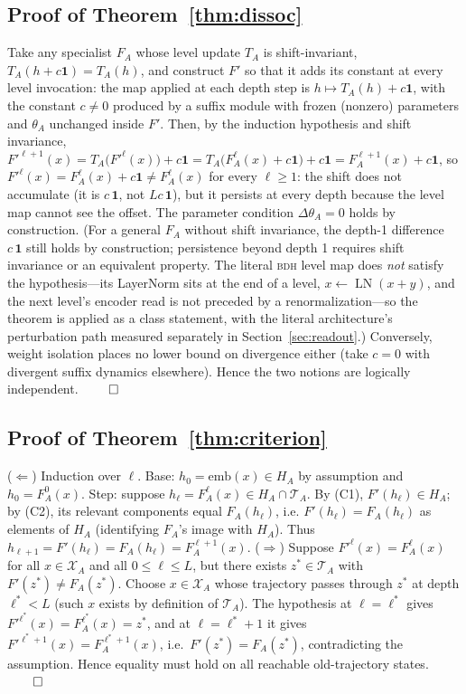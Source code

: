 \documentclass[11pt]{article}
\theoremstyle{definition}\newtheorem{definition}{Definition}
\theoremstyle{remark}\newtheorem{remark}{Remark}
\newcommand{\BDH}{\textsc{bdh}}
\newcommand{\Xa}{\mathcal{X}_A}
\newcommand{\TA}{\mathcal{T}_A}
\begin{document}
\subsection{Proof of Theorem~\ref{thm:dissoc}}
Take any specialist $F_A$ whose level update $T_A$ is shift-invariant,
$T_A(h+c\mathbf{1})=T_A(h)$, and construct $F'$ so that it adds its constant at every level
invocation: the map applied at each depth step is $h\mapsto T_A(h)+c\mathbf{1}$, with the
constant $c\neq0$ produced by a suffix module with frozen (nonzero) parameters and $\theta_A$
unchanged inside $F'$. Then, by the induction hypothesis and shift invariance,
$F'^{\ell+1}(x)=T_A\bigl(F'^{\ell}(x)\bigr)+c\mathbf{1}
=T_A\bigl(F_A^{\ell}(x)+c\mathbf{1}\bigr)+c\mathbf{1}=F_A^{\ell+1}(x)+c\mathbf{1}$, so
$F'^{\ell}(x)=F_A^{\ell}(x)+c\mathbf{1}\neq F_A^{\ell}(x)$ for every $\ell\ge1$: the shift
does not accumulate (it is $c\,\mathbf{1}$, not $Lc\,\mathbf{1}$), but it persists at every
depth because the level map cannot see the offset. The parameter condition
$\Delta\theta_A=0$ holds by construction. (For a general $F_A$ without shift invariance, the
depth-1 difference $c\,\mathbf{1}$ still holds by construction; persistence beyond depth 1
requires shift invariance or an equivalent property. The literal \BDH{} level map does
\emph{not} satisfy the hypothesis---its LayerNorm sits at the end of a level,
$x\leftarrow\operatorname{LN}(x+y)$, and the next level's encoder read is not preceded by a
renormalization---so the theorem is applied as a class statement, with the literal
architecture's perturbation path measured separately in Section~\ref{sec:readout}.)
Conversely, weight isolation places no lower bound on divergence either (take $c=0$ with
divergent suffix dynamics elsewhere). Hence the two notions are logically independent.
\hfill$\qed$

\subsection{Proof of Theorem~\ref{thm:criterion}}
($\Leftarrow$) Induction over $\ell$. Base: $h_0=\mathrm{emb}(x)\in H_A$ by assumption and
$h_0=F_A^0(x)$. Step: suppose $h_\ell=F_A^\ell(x)\in H_A\cap\TA$. By (C1),
$F'(h_\ell)\in H_A$; by (C2), its relevant components equal $F_A(h_\ell)$, i.e.
$F'(h_\ell)=F_A(h_\ell)$ as elements of $H_A$ (identifying $F_A$'s image with $H_A$).
Thus $h_{\ell+1}=F'(h_\ell)=F_A(h_\ell)=F_A^{\ell+1}(x)$.
($\Rightarrow$) Suppose $F'^{\ell}(x)=F_A^{\ell}(x)$ for all $x\in\Xa$ and all
$0\le\ell\le L$, but there exists
$z^*\in\TA$ with $F'(z^*)\neq F_A(z^*)$. Choose $x\in\Xa$ whose trajectory passes through
$z^*$ at depth $\ell^*<L$ (such $x$ exists by definition of $\TA$). The hypothesis at
$\ell=\ell^*$ gives $F'^{\ell^*}(x)=F_A^{\ell^*}(x)=z^*$, and at $\ell=\ell^*+1$ it gives
$F'^{\ell^*+1}(x)=F_A^{\ell^*+1}(x)$, i.e.\ $F'(z^*)=F_A(z^*)$, contradicting the assumption. Hence equality must
hold on all reachable old-trajectory states. \hfill$\qed$
\end{document}
